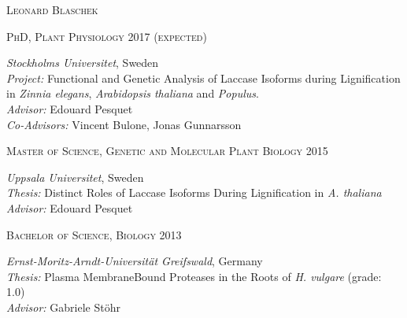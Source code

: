 \documentclass[11pt]{article}
\begin{document}
	\pagestyle{empty}
\begin{center}
	\huge{\textsc{Leonard Blaschek}}
	\vspace*{1cm}
\end{center}

\vspace{0.2cm}

\textsc{\large{PhD, Plant Physiology}} \hfill \textsc{2017 \textnormal{(expected)}}
\begin{addmargin}[24pt]{0pt}
	\textit{Stockholms Universitet}, Sweden \\
	\textit{Project:} Functional and Genetic Analysis of Laccase Isoforms during Lignification
	in \textit{Zinnia elegans}, \textit{Arabidopsis thaliana} and \textit{Populus}. \\
	\textit{Advisor:} Edouard Pesquet \\
	\textit{Co-Advisors:} Vincent Bulone, Jonas Gunnarsson
\end{addmargin}
\vspace{0.2cm}

\textsc{\large{Master of Science, Genetic and Molecular Plant Biology}} \hfill \textsc{2015}
\begin{addmargin}[24pt]{0pt}
	\textit{Uppsala Universitet}, Sweden \\
	\textit{Thesis:} Distinct Roles of Laccase Isoforms During Lignification in \textit{A. thaliana}\\
	\textit{Advisor:} Edouard Pesquet
\end{addmargin}
\vspace{0.2cm}

\textsc{\large{Bachelor of Science, Biology}} \hfill \textsc{2013}
\begin{addmargin}[24pt]{0pt}
	\textit{Ernst-Moritz-Arndt-Universität Greifswald}, Germany \\
	\textit{Thesis:} Plasma Membrane\textendash Bound Proteases in the Roots of \textit{H. vulgare} (grade: \textsc{1.0}) \\
	\textit{Advisor:} Gabriele Stöhr
\end{addmargin}
\vspace{1cm}
\end{document}
